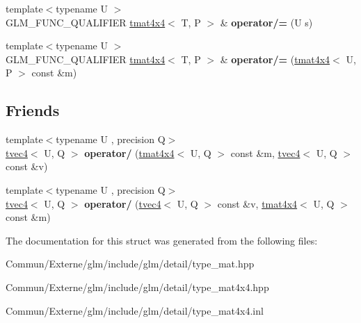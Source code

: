 \begin{DoxyCompactItemize}
\item 
{\footnotesize template$<$typename U $>$ }\\G\+L\+M\+\_\+\+F\+U\+N\+C\+\_\+\+Q\+U\+A\+L\+I\+F\+I\+ER \hyperlink{structglm_1_1detail_1_1tmat4x4}{tmat4x4}$<$ T, P $>$ \& {\bfseries operator/=} (U s)\hypertarget{structglm_1_1detail_1_1tmat4x4_a35520d796cd223a312d44020b3031f75}{}\label{structglm_1_1detail_1_1tmat4x4_a35520d796cd223a312d44020b3031f75}

\item 
{\footnotesize template$<$typename U $>$ }\\G\+L\+M\+\_\+\+F\+U\+N\+C\+\_\+\+Q\+U\+A\+L\+I\+F\+I\+ER \hyperlink{structglm_1_1detail_1_1tmat4x4}{tmat4x4}$<$ T, P $>$ \& {\bfseries operator/=} (\hyperlink{structglm_1_1detail_1_1tmat4x4}{tmat4x4}$<$ U, P $>$ const \&m)\hypertarget{structglm_1_1detail_1_1tmat4x4_ac5a16fad4c2fb2aac28c584fbcc7ee74}{}\label{structglm_1_1detail_1_1tmat4x4_ac5a16fad4c2fb2aac28c584fbcc7ee74}

\end{DoxyCompactItemize}
\subsection*{Friends}
\begin{DoxyCompactItemize}
\item 
{\footnotesize template$<$typename U , precision Q$>$ }\\\hyperlink{structglm_1_1detail_1_1tvec4}{tvec4}$<$ U, Q $>$ {\bfseries operator/} (\hyperlink{structglm_1_1detail_1_1tmat4x4}{tmat4x4}$<$ U, Q $>$ const \&m, \hyperlink{structglm_1_1detail_1_1tvec4}{tvec4}$<$ U, Q $>$ const \&v)\hypertarget{structglm_1_1detail_1_1tmat4x4_a4d1472f6e50839c280a3a7f32396b3f1}{}\label{structglm_1_1detail_1_1tmat4x4_a4d1472f6e50839c280a3a7f32396b3f1}

\item 
{\footnotesize template$<$typename U , precision Q$>$ }\\\hyperlink{structglm_1_1detail_1_1tvec4}{tvec4}$<$ U, Q $>$ {\bfseries operator/} (\hyperlink{structglm_1_1detail_1_1tvec4}{tvec4}$<$ U, Q $>$ const \&v, \hyperlink{structglm_1_1detail_1_1tmat4x4}{tmat4x4}$<$ U, Q $>$ const \&m)\hypertarget{structglm_1_1detail_1_1tmat4x4_a786a67d54520cab5d9ecd91530012ac2}{}\label{structglm_1_1detail_1_1tmat4x4_a786a67d54520cab5d9ecd91530012ac2}

\end{DoxyCompactItemize}


The documentation for this struct was generated from the following files\+:\begin{DoxyCompactItemize}
\item 
Commun/\+Externe/glm/include/glm/detail/type\+\_\+mat.\+hpp\item 
Commun/\+Externe/glm/include/glm/detail/type\+\_\+mat4x4.\+hpp\item 
Commun/\+Externe/glm/include/glm/detail/type\+\_\+mat4x4.\+inl\end{DoxyCompactItemize}

